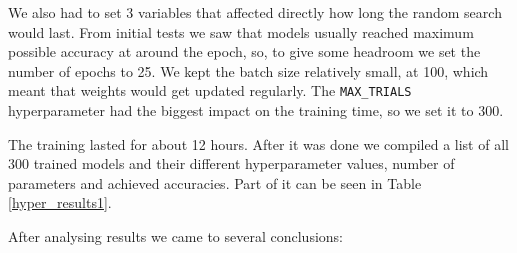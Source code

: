 We also had to set 3 variables that affected directly how long the random search would last.
From initial tests we saw that models usually reached maximum possible accuracy at around the  epoch, so, to give some headroom we set the number of epochs to 25.
We kept the batch size relatively small, at 100, which meant that weights would get updated regularly.
The \verb|MAX_TRIALS| hyperparameter had the biggest impact on the training time, so we set it to 300.

The training lasted for about 12 hours. 
After it was done we compiled a list of all 300 trained models and their different hyperparameter values, number of parameters and achieved accuracies.
Part of it can be seen in Table \ref{hyper_results1}.

After analysing results we came to several conclusions:

